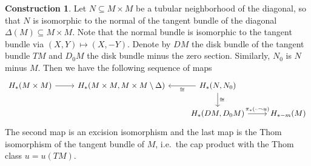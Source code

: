\documentclass{scrartcl}
\theoremstyle{plain}
\theoremstyle{definition}
\newtheorem{construction}[theorem]{Construction}
\renewcommand{\subset}{\subseteq}
\newcommand{\capp}{\mathbin{\frown}}
\newcommand{\iso}{\cong}
\begin{document}
\begin{construction}
Let $N\subset M\times M$ be a tubular neighborhood of the diagonal, so that $N$ is isomorphic to the normal of the tangent bundle of the diagonal $\Delta(M)\subset M\times M$. Note that the normal bundle is isomorphic to the tangent bundle via $(X, Y)\mapsto (X, -Y)$. Denote by $DM$ the disk bundle of the tangent bundle $TM$ and $D_0M$ the disk bundle minus the zero section. Similarly, $N_0$ is $N$ minus $M$. Then we have the following sequence of maps
\begin{equation}
\begin{tikzcd}
    H_*(M\times M) \rar & H_*(M\times M, M\times M\setminus \Delta) & \lar["\iso"] H_*(N, N_0) \dar["\iso"] &\ \\
    & & H_*(DM, D_0M) \rar["\pi_*(\cdot \capp u)"] & H_{*-m}(M)
\end{tikzcd}
\end{equation}
The second map is an excision isomorphism and the last map is the Thom isomorphism of the tangent bundle of $M$, i.e.\ the cap product with the Thom class $u=u(TM)$. 
\end{construction}
\end{document}

